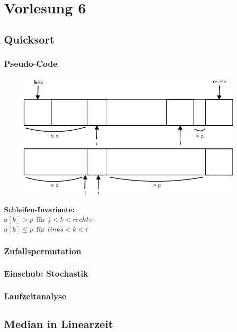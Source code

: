 \chapter{Vorlesung 6}

\section{Quicksort}

\subsection{Pseudo-Code}


\subsubsection*{}
\begin{figure}
\vspace{-40pt}
\includegraphics[width=\linewidth]{6/Grafik/img1.png}
\includegraphics[width=\linewidth]{6/Grafik/img2.png}
\caption{}
\end{figure}

\vspace{30pt}
\textbf{Schleifen-Invariante:}\\
$a[k] > p~~\text{für}~~j <k<rechts$\\
$a[k] \leq p ~~\text{für}~~links<k<i$ 
\vspace{50pt}

\pagebreak 

\subsection{Zufallspermutation}


\subsection{Einschub: Stochastik}

\subsection{Laufzeitanalyse}


\section{Median in Linearzeit}